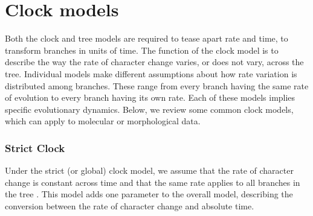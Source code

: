 \section{Clock models}
Both the clock and tree models are required to tease apart rate and time,  to transform branches in units of time.
The function of the clock model is to describe the way the rate of character change varies, or does not vary, across the tree.
Individual models make different assumptions about how rate variation is distributed among branches.
These range from  every branch having the same rate of evolution to every branch having its own rate.
Each of these models implies specific evolutionary dynamics.
Below, we review some common clock models, which can apply to molecular or morphological data.

\subsubsection{Strict Clock}
Under the strict (or global) clock model, we assume that the rate of character change is constant across time and that the same rate applies to all branches in the tree \citep{Zuckerkandl1962, Zuckerkandl1965EvolutionaryDivergenceConvergence}.
This model adds one parameter to the overall model, describing the conversion between the rate of character change  and absolute time.

